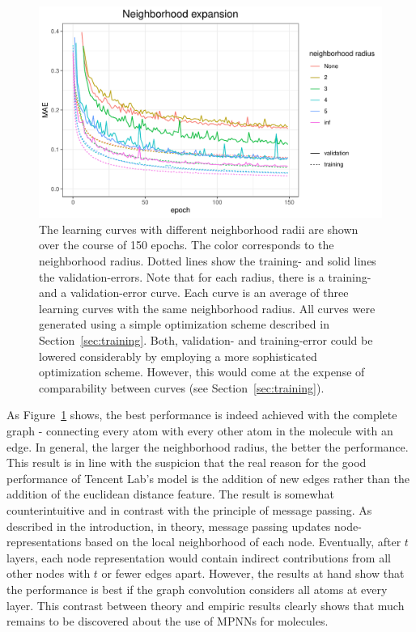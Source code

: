 \begin{figure}[H]
	\includegraphics[width=\linewidth]{figures/neighborhood-expansion}
	
	\caption{The learning curves with different neighborhood radii are shown over the course of 150 epochs. The color corresponds to the neighborhood radius. Dotted lines show the training- and solid lines the validation-errors. Note that for each radius, there is a training- and a validation-error curve. Each curve is an average of three learning curves with the same neighborhood radius. All curves were generated using a simple optimization scheme described in Section~\ref{sec:training}. Both, validation- and training-error could be lowered considerably by employing a more sophisticated optimization scheme. However, this would come at the expense of comparability between curves (see Section~\ref{sec:training}).}
	\label{fig:neighborhood-expansion}
\end{figure}

As Figure~\ref{fig:neighborhood-expansion} shows, the best performance is indeed achieved with the complete graph - connecting every atom with every other atom in the molecule with an edge. In general, the larger the neighborhood radius, the better the performance. This result is in line with the suspicion that the real reason for the good performance of Tencent Lab's model is the addition of new edges rather than the addition of the euclidean distance feature.
The result is somewhat counterintuitive and in contrast with the principle of message passing. As described in the introduction, in theory, message passing updates node-representations based on the local neighborhood of each node. Eventually, after $t$ layers, each node representation would contain indirect contributions from all other nodes with $t$ or fewer edges apart. However, the results at hand show that the performance is best if the graph convolution considers all atoms at every layer. This contrast between theory and empiric results clearly shows that much remains to be discovered about the use of MPNNs for molecules.

